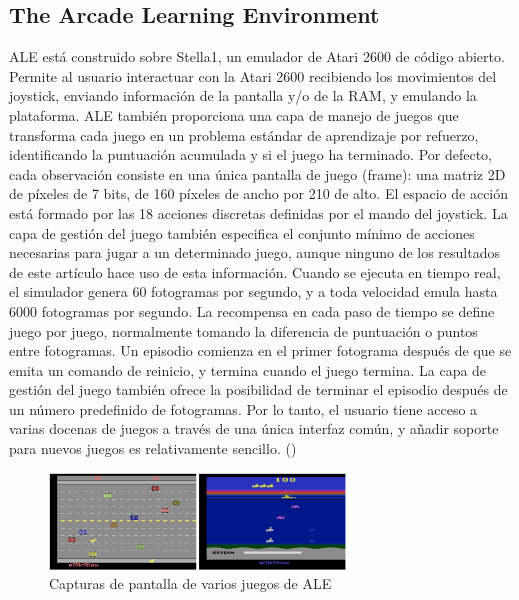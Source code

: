 \subsection{The Arcade Learning Environment}\label{section:state-of-the-art:evaluation-enviroments-for-generalization-on-rl-algoritms:ALE}

ALE está construido sobre Stella1, un emulador de Atari 2600 de código abierto. Permite al usuario interactuar con la Atari 2600 recibiendo los movimientos del joystick, enviando información de la pantalla y/o de la RAM, y emulando la plataforma. ALE también proporciona una capa de manejo de juegos que transforma cada juego en un problema estándar de aprendizaje por refuerzo, identificando la puntuación acumulada y si el juego ha terminado. Por defecto, cada observación consiste en una única pantalla de juego (frame): una matriz 2D de píxeles de 7 bits, de 160 píxeles de ancho por 210 de alto. El espacio de acción está formado por las 18 acciones discretas definidas por el mando del joystick. La capa de gestión del juego también especifica el conjunto mínimo de acciones necesarias para jugar a un determinado juego, aunque ninguno de los resultados de este artículo hace uso de esta información. Cuando se ejecuta en tiempo real, el simulador genera 60 fotogramas por segundo, y a toda velocidad emula hasta 6000 fotogramas por segundo. La recompensa en cada paso de tiempo se define juego por juego, normalmente tomando la diferencia de puntuación o puntos entre fotogramas. Un episodio comienza en el primer fotograma después de que se emita un comando de reinicio, y termina cuando el juego termina. La capa de gestión del juego también ofrece la posibilidad de terminar el episodio después de un número predefinido de fotogramas. Por lo tanto, el usuario tiene acceso a varias docenas de juegos a través de una única interfaz común, y añadir soporte para nuevos juegos es relativamente sencillo. (\cite{bellemare2013arcade})

\begin{figure}[ht!]
    \centering
    \includegraphics[width=0.7\textwidth]{Graphics/ale.png}
    \caption{Capturas de pantalla de varios juegos de ALE}
    \label{fig:ale}
\end{figure}

